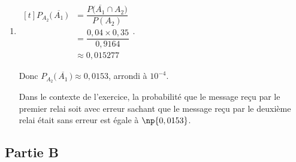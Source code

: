 \begin{enumerate}
	On a donc bien :  $P\left(A_{2}\right)=\np{0,9164}$.
		
		\item      $\begin{aligned}[t] P_{A_{2}}\big( \,\overline{A_{1}}\,\big)&= \dfrac{P  \big( \overline{A_1} \cap A_2 \big) }{P\left(A_{2}\right)}\\
			&= \dfrac{ 0,04 \times 0,35}{0,9164}\\
			&\approx 0,015277
			\end{aligned}$.
		
		Donc $P_{A_{2}}\big(\,\overline{A_{1}}\,\big)  \approx 0,0153 $,  arrondi  à $10^{-4}$.
		
	Dans le contexte de	l'exercice, la probabilité que le message reçu par le premier relai soit avec erreur sachant que le message reçu par le deuxième relai était sans erreur est égale à $\np{0,0153}$. 
	\end{enumerate}


\subsection*{Partie B}


